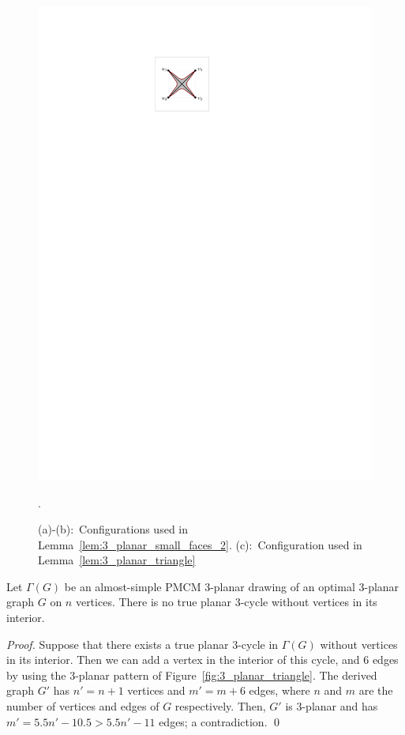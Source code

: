 \begin{figure}[htb]
\begin{minipage}[b]{.24\textwidth}
        \includegraphics[width=\textwidth,page=3]{images/3planar_one_crossing}
        \subcaption{~}\label{fig:3_planar_triangle}
    \end{minipage}
    \caption{%
    (a)-(b):~Configurations used in Lemma~\ref{lem:3_planar_small_faces_2}. (c):~Configuration used in Lemma~\ref{lem:3_planar_triangle}}.
    \label{fig:3_planar_one_crossing_1}
\end{figure}

\begin{lemma}
Let $\Gamma(G)$ be an almost-simple PMCM $3$-planar drawing of an optimal $3$-planar graph $G$ on $n$ vertices. There is no true planar $3$-cycle without vertices in its interior. 
\label{lem:3_planar_triangle}
\end{lemma}
\begin{proof}
Suppose that there exists a true planar $3$-cycle in $\Gamma(G)$ without vertices in its interior. Then we can add a vertex in the interior of this cycle, and $6$ edges by using the $3$-planar pattern of Figure~\ref{fig:3_planar_triangle}. The derived graph $G'$ has $n'=n+1$ vertices and $m'=m+6$ edges, where $n$ and $m$ are the number of vertices and edges of $G$ respectively. Then, $G'$ is $3$-planar and has $m'=5.5n'-10.5>5.5n'-11$ edges; a contradiction.
\qed
\end{proof}


